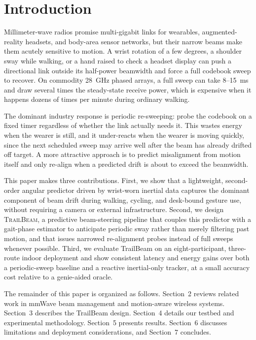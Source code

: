 \section{Introduction}
Millimeter-wave radios promise multi-gigabit links for wearables, augmented-reality headsets, and body-area sensor networks, but their narrow beams make them acutely sensitive to motion. A wrist rotation of a few degrees, a shoulder sway while walking, or a hand raised to check a headset display can push a directional link outside its half-power beamwidth and force a full codebook sweep to recover. On commodity 28~GHz phased arrays, a full sweep can take 8--15~ms and draw several times the steady-state receive power, which is expensive when it happens dozens of times per minute during ordinary walking.

The dominant industry response is periodic re-sweeping: probe the codebook on a fixed timer regardless of whether the link actually needs it. This wastes energy when the wearer is still, and it under-reacts when the wearer is moving quickly, since the next scheduled sweep may arrive well after the beam has already drifted off target. A more attractive approach is to predict misalignment from motion itself and only re-align when a predicted drift is about to exceed the beamwidth.

This paper makes three contributions. First, we show that a lightweight, second-order angular predictor driven by wrist-worn inertial data captures the dominant component of beam drift during walking, cycling, and desk-bound gesture use, without requiring a camera or external infrastructure. Second, we design \textsc{TrailBeam}, a predictive beam-steering pipeline that couples this predictor with a gait-phase estimator to anticipate periodic sway rather than merely filtering past motion, and that issues narrowed re-alignment probes instead of full sweeps whenever possible. Third, we evaluate TrailBeam on an eight-participant, three-route indoor deployment and show consistent latency and energy gains over both a periodic-sweep baseline and a reactive inertial-only tracker, at a small accuracy cost relative to a genie-aided oracle.

The remainder of this paper is organized as follows. Section~2 reviews related work in mmWave beam management and motion-aware wireless systems. Section~3 describes the TrailBeam design. Section~4 details our testbed and experimental methodology. Section~5 presents results. Section~6 discusses limitations and deployment considerations, and Section~7 concludes.
